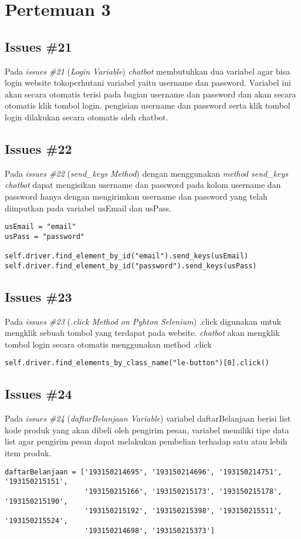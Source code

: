 \chapter{Pertemuan 3}

\section{Issues \#21}
Pada \textit{issues \#21} (\textit{Login Variable}) \textit{chatbot} membutuhkan dua variabel agar bisa login website tokoperhutani variabel yaitu username dan password. Variabel ini akan secara otomatis terisi pada bagian username dan password dan akan secara otomatis klik tombol login. pengisian username dan password serta klik tombol login dilakukan secara otomatis oleh chatbot.

\section{Issues \#22}
Pada \textit{issues \#22} (\textit{send\_keys Method}) dengan menggunakan \textit{method send\_keys} \textit{chatbot} dapat mengisikan username dan password pada kolom username dan password hanya dengan mengirimkan username dan password yang telah diinputkan pada variabel usEmail dan usPass.
\begin{verbatim}
usEmail = "email"
usPass = "password"

self.driver.find_element_by_id("email").send_keys(usEmail)
self.driver.find_element_by_id("password").send_keys(usPass)
\end{verbatim} 

\section{Issues \#23}
Pada \textit{issues \#23} (\textit{.click Method on Pyhton Selenium}) .click digunakan untuk mengklik sebuah tombol yang terdapat pada website. \textit{chatbot} akan mengklik tombol login secara otomatis menggunakan method .click
\begin{verbatim}
self.driver.find_elements_by_class_name("le-button")[0].click()
\end{verbatim}

\section{Issues \#24}
Pada \textit{issues \#24} (\textit{daftarBelanjaan Variable}) variabel daftarBelanjaan berisi list kode produk yang akan dibeli oleh pengirim pesan, variabel memiliki tipe data list agar pengirim pesan dapat melakukan pembelian terhadap satu atau lebih item produk.
\begin{verbatim}
daftarBelanjaan = ['193150214695', '193150214696', '193150214751', '193150215151', 
                   '193150215166', '193150215173', '193150215178', '193150215190', 
                   '193150215192', '193150215398', '193150215511', '193150215524',
          		   '193150214698', '193150215373']
\end{verbatim}

